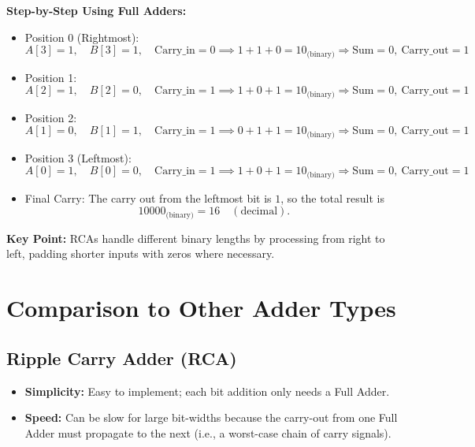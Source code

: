 \documentclass[12pt]{article}
\begin{document}
\noindent \textbf{Step-by-Step Using Full Adders:}
\begin{itemize}
  \item Position 0 (Rightmost):
    \[
      A[3] = 1, \quad B[3] = 1, \quad \text{Carry_in} = 0
      \implies 1 + 1 + 0 = 10_{\text{(binary)}} \Rightarrow \text{Sum} = 0, \ \text{Carry_out} = 1
    \]
  \item Position 1:
    \[
      A[2] = 1, \quad B[2] = 0, \quad \text{Carry_in} = 1
      \implies 1 + 0 + 1 = 10_{\text{(binary)}} \Rightarrow \text{Sum} = 0, \ \text{Carry_out} = 1
    \]
  \item Position 2:
    \[
      A[1] = 0, \quad B[1] = 1, \quad \text{Carry_in} = 1
      \implies 0 + 1 + 1 = 10_{\text{(binary)}} \Rightarrow \text{Sum} = 0, \ \text{Carry_out} = 1
    \]
  \item Position 3 (Leftmost):
    \[
      A[0] = 1, \quad B[0] = 0, \quad \text{Carry_in} = 1
      \implies 1 + 0 + 1 = 10_{\text{(binary)}} \Rightarrow \text{Sum} = 0, \ \text{Carry_out} = 1
    \]
  \item Final Carry: The carry out from the leftmost bit is $1$, so the total result is
    \[
      1 0000_{\text{(binary)}} = 16 \quad (\text{decimal}).
    \]
\end{itemize}

\noindent \textbf{Key Point:} RCAs handle different binary lengths by processing from right to left, padding shorter inputs with zeros where necessary.

\section{Comparison to Other Adder Types}

\subsection{Ripple Carry Adder (RCA)}
\begin{itemize}
  \item \textbf{Simplicity:} Easy to implement; each bit addition only needs a Full Adder.
  \item \textbf{Speed:} Can be slow for large bit-widths because the carry-out from one Full Adder must propagate to the next (i.e., a worst-case chain of carry signals).
\end{itemize}
\end{document}
